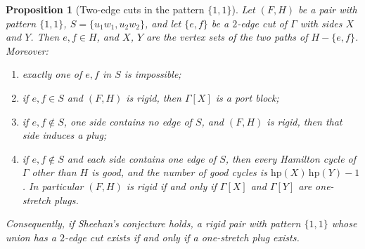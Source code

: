 \documentclass[11pt,a4paper]{article}
\newtheorem{proposition}[theorem]{Proposition}
\theoremstyle{definition}
\theoremstyle{remark}
\begin{document}
\begin{proposition}[Two-edge cuts in the pattern $\{1,1\}$]\label{prop:cut11}
Let $(F,H)$ be a pair with pattern $\{1,1\}$, $S=\{u_1w_1,u_2w_2\}$, and let $\{e,f\}$ be a $2$-edge cut of $\Gamma$ with sides $X$ and $Y$. Then $e,f\in H$, and $X$, $Y$ are the vertex sets of the two paths of $H-\{e,f\}$. Moreover:
\begin{enumerate}
\item[(a)] exactly one of $e,f$ in $S$ is impossible;
\item[(b)] if $e,f\in S$ and $(F,H)$ is rigid, then $\Gamma[X]$ is a port block;
\item[(c)] if $e,f\notin S$, one side contains no edge of $S$, and $(F,H)$ is rigid, then that side induces a plug;
\item[(d)] if $e,f\notin S$ and each side contains one edge of $S$, then every Hamilton cycle of $\Gamma$ other than $H$ is good, and the number of good cycles is $\mathrm{hp}(X)\,\mathrm{hp}(Y)-1$. In particular $(F,H)$ is rigid if and only if $\Gamma[X]$ and $\Gamma[Y]$ are one-stretch plugs.
\end{enumerate}
Consequently, if Sheehan's conjecture holds, a rigid pair with pattern $\{1,1\}$ whose union has a $2$-edge cut exists if and only if a one-stretch plug exists.
\end{proposition}
\end{document}
